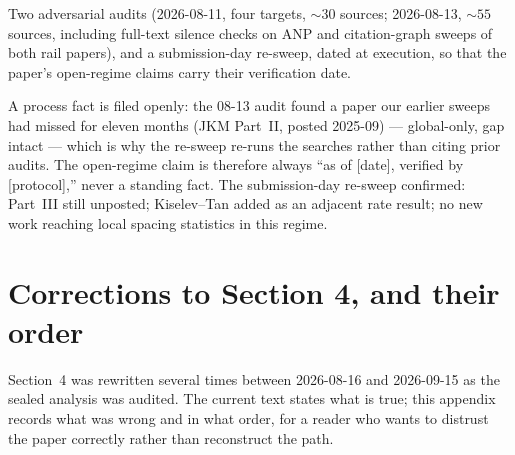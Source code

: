 \documentclass[11pt]{article}
\begin{document}
Two adversarial audits (2026-08-11, four targets, ${\sim}30$ sources; 2026-08-13, ${\sim}55$
sources, including full-text silence checks on ANP and citation-graph sweeps of both rail
papers), and a submission-day re-sweep, dated at execution, so that the paper's open-regime
claims carry their verification date.

A process fact is filed openly: the 08-13 audit found a paper our earlier sweeps had missed for
eleven months (JKM Part~II, posted 2025-09) --- global-only, gap intact --- which is why the
re-sweep re-runs the searches rather than citing prior audits. The open-regime claim is therefore
always ``as of [date], verified by [protocol],'' never a standing fact. The submission-day
re-sweep confirmed: Part~III still unposted; Kiselev--Tan added as an adjacent rate result; no
new work reaching local spacing statistics in this regime.

\section{Corrections to Section 4, and their order}
\label{app:corrections}

Section~4 was rewritten several times between 2026-08-16 and 2026-09-15 as the sealed
analysis was audited. The current text states what is true; this appendix records what was
wrong and in what order, for a reader who wants to distrust the paper correctly rather than
reconstruct the path.
\end{document}
